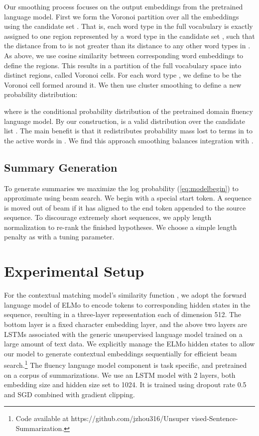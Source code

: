 \documentclass[11pt,a4paper]{article}
\begin{document}
Our smoothing process focuses on the output embeddings from the pretrained language model. First we form the Voronoi partition \cite{aurenhammer1991voronoi} over all the embeddings using the candidate set . That is, each word type  in the full vocabulary  is exactly assigned to one region represented by a word type  in the candidate set , such that the distance from  to  is not greater than its distance to any other word types in . As above, we use cosine similarity between corresponding word embeddings to define the regions. This results in a partition of the full vocabulary space into  distinct regions, called Voronoi cells. For each word type , we define  to be the Voronoi cell formed around it.
We then use cluster smoothing to define a new probability distribution:

\noindent
where  is the conditional probability distribution of the pretrained domain fluency language model.
By our construction,  is a valid distribution over the candidate list .
The main benefit is that it redistributes probability mass lost to terms in  to the active words in . 
We find this approach smoothing balances integration with . 

\subsection{Summary Generation}

To generate summaries we maximize the log probability (\ref{eq:modelbegin}) to approximate  using beam search. We begin with a special start token.
A sequence is moved out of beam if it has aligned to the end token appended to the source sequence. To discourage extremely short sequences, we apply length normalization to re-rank the finished hypotheses. We choose a simple length penalty as  with  a tuning parameter. 


\section{Experimental Setup}
For the contextual matching model's similarity function , we adopt the forward language model of ELMo \cite{peters2018deep} to encode tokens to corresponding hidden states in the sequence, resulting in a three-layer representation each of dimension 512. The bottom layer is a fixed character embedding layer, and the above two layers are LSTMs associated with the generic unsupervised language model trained on a large amount of text data.
We explicitly manage the ELMo hidden states to allow our model to generate contextual embeddings sequentially for efficient beam search.\footnote{Code available at https://github.com/jzhou316/Unsuper
vised-Sentence-Summarization.}
The fluency language model component  is task specific, and pretrained on a corpus of summarizations. We use an LSTM model with 2 layers, both embedding size and hidden size set to 1024. It is trained using dropout rate 0.5 and SGD combined with gradient clipping.
\end{document}
